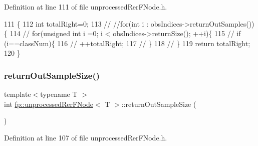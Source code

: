 Definition at line 111 of file unprocessed\+Rer\+F\+Node.\+h.


\begin{DoxyCode}
111                                                              \{
112                     \textcolor{keywordtype}{int} totalRight=0;
113                     \textcolor{comment}{//  //for(int i : obsIndices->returnOutSamples())\{}
114                     \textcolor{comment}{//  for(unsigned int i =0; i <  obsIndices->returnSize(); ++i)\{}
115                     \textcolor{comment}{//      if (i==classNum)\{}
116                     \textcolor{comment}{//      ++totalRight;}
117                     \textcolor{comment}{//      \}}
118                     \textcolor{comment}{//      \}}
119                     \textcolor{keywordflow}{return} totalRight;
120                 \}
\end{DoxyCode}
\mbox{\label{classfp_1_1unprocessedRerFNode_a850d04831326a6d700258bc8526cf7a2}} 
\subsubsection{\texorpdfstring{return\+Out\+Sample\+Size()}{returnOutSampleSize()}}
{\footnotesize\ttfamily template$<$typename T $>$ \\
int \hyperlink{classfp_1_1unprocessedRerFNode}{fp\+::unprocessed\+Rer\+F\+Node}$<$ T $>$\+::return\+Out\+Sample\+Size (\begin{DoxyParamCaption}{ }\end{DoxyParamCaption})\hspace{0.3cm}{\ttfamily [inline]}}



Definition at line 107 of file unprocessed\+Rer\+F\+Node.\+h.


